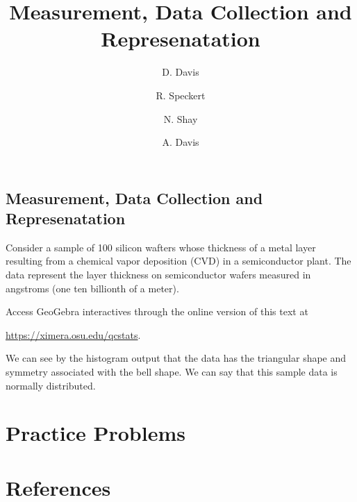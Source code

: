 \documentclass{ximera}
\author{D. Davis \and R. Speckert \and N. Shay \and A. Davis}
\title{Measurement, Data Collection and Represenatation} \license{CC BY-NC-SA 4.0}
\begin{document}
\begin{abstract}
\end{abstract}
\maketitle

\begin{onlineOnly}
\section*{Measurement, Data Collection and Represenatation}
\end{onlineOnly}

\begin{exploration}
Consider a sample of 100 silicon wafters whose thickness of a metal layer resulting from a chemical vapor deposition (CVD) in a semiconductor plant. The data represent the layer thickness on semiconductor wafers measured in angstroms (one ten billionth of a meter).

\begin{pdfOnly}
Access GeoGebra interactives through the online version of this text at 

\href{https://ximera.osu.edu/qcstats/QC_stats}{https://ximera.osu.edu/qcstats}.
\end{pdfOnly}

\begin{onlineOnly}
\begin{center} 
\end{center}
\end{onlineOnly}

We can see by the histogram output that the data has the triangular shape and symmetry associated with the bell shape. We can say that this sample data is normally distributed.


\end{exploration}


\section*{Practice Problems}

\section*{References}
\end{document}
